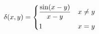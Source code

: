 \[
\delta(x, y) = 
\begin{dcases} 
    \frac{\sin(x-y)}{x-y} & x \neq y \\
    1                     & x = y
\end{dcases}
\]
